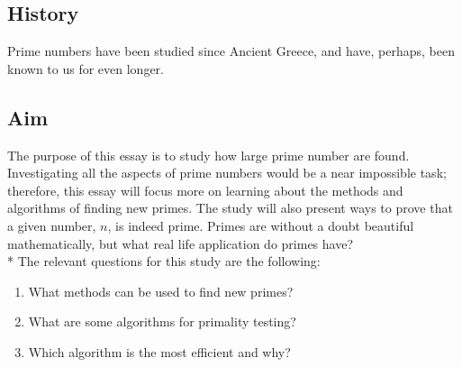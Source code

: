 \documentclass[main.tex]{subfiles}
\begin{document}
\subsection{History}
Prime numbers have been studied since Ancient Greece, and have, perhaps, been known to us for even longer. \cite{prime}

\subsection{Aim}
The purpose of this essay is to study how large prime number are found. Investigating all the aspects of prime numbers would be a near impossible task; therefore, this essay will focus more on learning about the methods and algorithms of finding new primes. The study will also present ways to prove that a given number, $n$, is indeed prime. Primes are without a doubt beautiful mathematically, but what real life application do primes have?
\newline
\\*
The relevant questions for this study are the following:
\begin{enumerate}
    \item What methods can be used to find new primes?
    \item What are some algorithms for primality testing?
    \item Which algorithm is the most efficient and why?
\end{enumerate}
\end{document}

